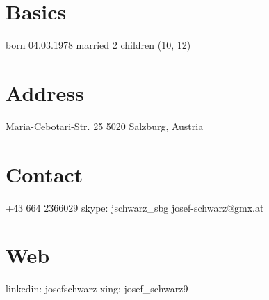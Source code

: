 \documentclass[]{cv-style}          %
\begin{document}
\lastupdated


\begin{aside}
%
\section{Basics}
born 04.03.1978
married
2 children (10, 12)
%
\section{Address}
Maria-Cebotari-Str. 25
5020 Salzburg, Austria
%
\section{Contact}
+43 664 2366029
skype: jschwarz\_sbg
josef-schwarz@gmx.at
%
\section{Web}
linkedin: josefschwarz
xing: josef\_schwarz9
%
\section{ }
\section{ }
\section{ }
\section{ }
\section{ }
\section{ }
\section{ }
\section{ }

\end{aside}
\end{document}
